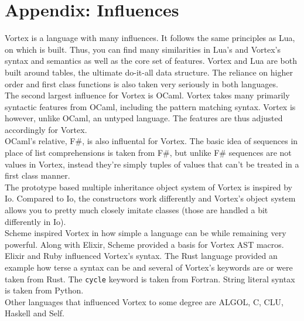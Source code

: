 \documentclass{article}
\begin{document}
\section{Appendix: Influences}
Vortex is a language with many influences. It follows the same principles as
Lua, on which is built. Thus, you can find many similarities in Lua's and
Vortex's syntax and semantics as well as the core set of features. Vortex and
Lua are both built around tables, the ultimate do-it-all data structure.
The reliance on higher order and first class functions is also taken very
seriously in both languages.\\
The second largest influence for Vortex is OCaml. Vortex takes many primarily
syntactic features from OCaml, including the pattern matching syntax. Vortex
is however, unlike OCaml, an untyped language. The features are thus adjusted
accordingly for Vortex.\\
OCaml's relative, F\#, is also influental for Vortex. The basic idea of
sequences in place of list comprehensions is taken from F\#, but unlike
F\# sequences are not values in Vortex, instead they're simply tuples
of values that can't be treated in a first class manner.\\
The prototype based multiple inheritance object system of Vortex is inspired
by Io. Compared to Io, the constructors work differently and Vortex's object
system allows you to pretty much closely imitate classes (those are handled
a bit differently in Io).\\
Scheme inspired Vortex in how simple a language can be while remaining very
powerful. Along with Elixir, Scheme provided a basis for Vortex AST macros.\\
Elixir and Ruby influenced Vortex's syntax. The Rust language provided an
example how terse a syntax can be and several of Vortex's keywords are or
were taken from Rust. The \verb|cycle| keyword is taken from Fortran.
String literal syntax is taken from Python.\\
Other languages that influenced Vortex to some degree are ALGOL, C, CLU,
Haskell and Self.
\end{document}
